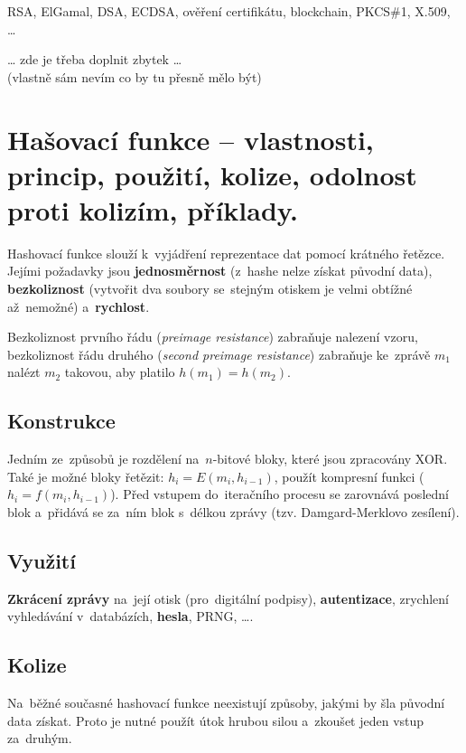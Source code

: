 RSA, ElGamal, DSA, ECDSA, ověření certifikátu, blockchain, PKCS\#1, X.509, \dots

\begin{center}
{\huge \dots} zde je třeba doplnit zbytek {\huge \dots} \\
(vlastně sám nevím co by tu přesně mělo být)
\end{center}

\clearpage
\section{Hašovací funkce -- vlastnosti, princip, použití, kolize, odolnost proti kolizím, příklady.}

Hashovací funkce slouží k~vyjádření reprezentace dat pomocí krátného řetězce. Jejími požadavky jsou \textbf{jednosměrnost} (z~hashe nelze získat původní data), \textbf{bezkoliznost} (vytvořit dva soubory se~stejným otiskem je velmi obtížné až~nemožné) a~\textbf{rychlost}.

Bezkoliznost prvního řádu (\emph{preimage resistance}) zabraňuje nalezení vzoru, bezkoliznost řádu druhého (\emph{second preimage resistance}) zabraňuje ke~zprávě $m_1$ nalézt $m_2$ takovou, aby platilo $h(m_1) = h(m_2)$.

\subsection{Konstrukce}

Jedním ze~způsobů je rozdělení na~$n$-bitové bloky, které jsou zpracovány XOR. Také je možné bloky řetězit: $h_i = E(m_i, h_{i-1})$, použít kompresní funkci ($h_i = f(m_i, h_{i-1})$). Před vstupem do~iteračního procesu se zarovnává poslední blok a~přidává se za~ním blok s~délkou zprávy (tzv. Damgard-Merklovo zesílení).

\subsection{Využití}

\textbf{Zkrácení zprávy} na~její otisk (pro~digitální podpisy), \textbf{autentizace}, zrychlení vyhledávání v~databázích, \textbf{hesla}, PRNG, \dots.


\subsection{Kolize}

Na~běžné současné hashovací funkce neexistují způsoby, jakými by šla původní data získat. Proto je nutné použít útok hrubou silou a~zkoušet jeden vstup za~druhým. %

